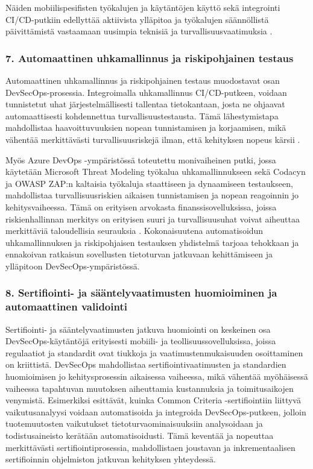 \documentclass[bscthesis,finnish,oneside,biblatex]{uefcsthesis}
\begin{document}
    Näiden mobiilispesifisten työkalujen ja käytäntöjen käyttö sekä integrointi CI/CD-putkiin edellyttää aktiivista ylläpitoa ja työkalujen säännöllistä päivittämistä vastaamaan uusimpia teknisiä ja turvallisuusvaatimuksia \cite{ozdenizci2024mobilizing}.

    \subsubsection{7. Automaattinen uhkamallinnus ja riskipohjainen testaus}

    Automaattinen uhkamallinnus ja riskipohjainen testaus muodostavat osan DevSecOps-prosessia. Integroimalla uhkamallinnus CI/CD-putkeen, voidaan tunnistetut uhat järjestelmällisesti tallentaa tietokantaan, josta ne ohjaavat automaattisesti kohdennettua turvallisuustestausta. Tämä lähestymistapa mahdollistaa haavoittuvuuksien nopean tunnistamisen ja korjaamisen, mikä vähentää merkittävästi turvallisuusriskejä ilman, että kehityksen nopeus kärsii \cite{nikolov2024_fit}.

    Myös Azure DevOps -ympäristössä toteutettu monivaiheinen putki, jossa käytetään Microsoft Threat Modeling työkalua uhkamallinnukseen sekä Codacyn ja OWASP ZAP:n kaltaisia työkaluja staattiseen ja dynaamiseen testaukseen, mahdollistaa turvallisuusriskien aikaisen tunnistamisen ja nopean reagoinnin jo kehitysvaiheessa. Tämä on erityisen arvokasta finanssisovelluksissa, joissa riskienhallinnan merkitys on erityisen suuri ja turvallisuusuhat voivat aiheuttaa merkittäviä taloudellisia seurauksia \cite{kushwaha2024_cct}. Kokonaisuutena automatisoidun uhkamallinnuksen ja riskipohjaisen testauksen yhdistelmä tarjoaa tehokkaan ja ennakoivan ratkaisun sovellusten tietoturvan jatkuvaan kehittämiseen ja ylläpitoon DevSecOps-ympäristössä.

    \subsubsection{8. Sertifiointi- ja sääntelyvaatimusten huomioiminen ja automaattinen validointi}

    Sertifiointi- ja sääntelyvaatimusten jatkuva huomiointi on keskeinen osa DevSecOps-käytäntöjä erityisesti mobiili- ja teollisuussovelluksissa, joissa regulaatiot ja standardit ovat tiukkoja ja vaatimustenmukaisuuden osoittaminen on kriittistä. DevSecOps mahdollistaa sertifiointivaatimusten ja standardien huomioimisen jo kehitysprosessin aikaisessa vaiheessa, mikä vähentää myöhäisessä vaiheessa tapahtuvan muutoksen aiheuttamia kustannuksia ja toimitusaikojen venymistä. Esimerkiksi \cite{dupont2021_incremental} esittävät, kuinka Common Criteria -sertifiointiin liittyvä vaikutusanalyysi voidaan automatisoida ja integroida DevSecOps-putkeen, jolloin tuotemuutosten vaikutukset tietoturvaominaisuuksiin analysoidaan ja todistusaineisto kerätään automatisoidusti. Tämä keventää ja nopeuttaa merkittävästi sertifiointiprosessia, mahdollistaen joustavan ja inkrementaalisen sertifioinnin ohjelmiston jatkuvan kehityksen yhteydessä.
\end{document}
